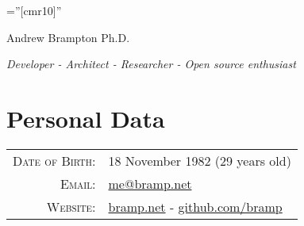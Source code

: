 \documentclass[a4paper,10pt]{article}
\newcounter{dateone}
\newcounter{datetwo}
\newcommand{\difftoday}[3]{%
      \setmydatenumber{dateone}{\the\year}{\the\month}{\the\day}%
      \setmydatenumber{datetwo}{#1}{#2}{#3}%
      \addtocounter{datetwo}{-\thedateone}%
      \the\numexpr-\thedatetwo/365\relax\space years
}
\begin{document}
\pagestyle{empty} %

\font\fb=''[cmr10]'' %

\par{\centering
	{\Huge Andrew Brampton Ph.D.}

	{\it Developer - Architect - Researcher - Open source enthusiast}
\bigskip\par}

\section{Personal Data}

\begin{tabular}{rl}
    \textsc{Date of Birth:} & 18 November 1982 (29 years old) \\
    \textsc{Email:}     & \href{mailto:me@bramp.net}{me@bramp.net}\\
    \textsc{Website:}   & \href{http://bramp.net}{bramp.net} - \href{https://github.com/bramp}{github.com/bramp}\\
\end{tabular}

\end{document}
